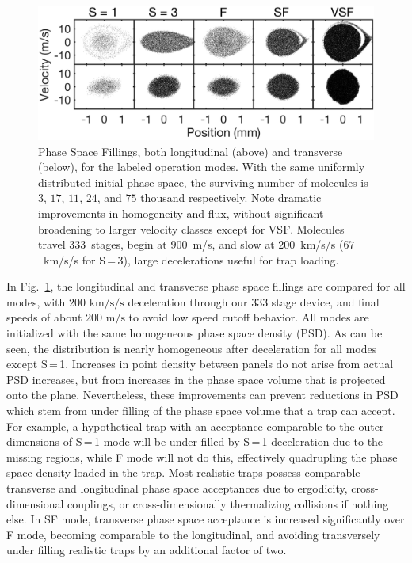 \documentclass[%
 reprint,
 amsmath,amssymb,
 aps,
prl,
]{revtex4-1}
\begin{document}
\begin{figure}[t]
\includegraphics[width=\linewidth]{5x2-PSD-Compare.png}
\vspace{-15pt}
\caption{\label{fig:phasespace}
Phase Space Fillings, both longitudinal (above) and transverse (below), for the labeled operation modes. 
With the same uniformly distributed initial phase space, the surviving number of molecules is $3$, $17$, $11$, $24$, and $75$ thousand respectively.
Note dramatic improvements in homogeneity and flux, without significant broadening to larger velocity classes except for VSF. 
Molecules travel $333$~stages, begin at $900$~m/s, and slow at $200$~km/s/s ($67$~km/s/s for S\,=\,3), large decelerations useful for trap loading.
\vspace{-15pt}}
\end{figure}

In Fig.~\ref{fig:phasespace}, the longitudinal and transverse phase space fillings are compared for all modes, with $200\text{ km/s/s}$ deceleration through our $333$ stage device, and final speeds of about $200\text{ m/s}$ to avoid low speed cutoff behavior. 
All modes are initialized with the same homogeneous phase space density (PSD).
As can be seen, the distribution is nearly homogeneous after deceleration for all modes except S\,=\,1.
Increases in point density between panels do not arise from actual PSD increases, but from increases in the phase space volume that is projected onto the plane.
Nevertheless, these improvements can prevent reductions in PSD which stem from under filling of the phase space volume that a trap can accept.
For example, a hypothetical trap with an acceptance comparable to the outer dimensions of S\,=\,1 mode will be under filled by S\,=\,1 deceleration due to the missing regions, while F mode will not do this, effectively quadrupling the phase space density loaded in the trap.
Most realistic traps possess comparable transverse and longitudinal phase space acceptances due to ergodicity, cross-dimensional couplings, or cross-dimensionally thermalizing collisions if nothing else.
In SF mode, transverse phase space acceptance is increased significantly over F mode, becoming comparable to the longitudinal, and avoiding transversely under filling realistic traps by an additional factor of two.
\end{document}

